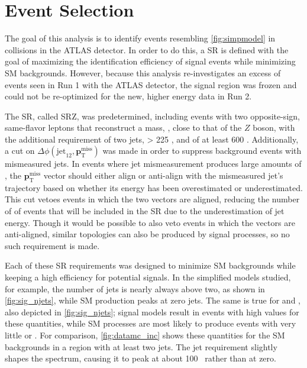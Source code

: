 
\chapter{Event Selection} %
\label{ch:eventsel} 

The goal of this analysis is to identify events resembling \autoref{fig:simpmodel} in collisions in the \ac{ATLAS} detector. In order to do this, a \acf{SR} is defined with the goal of maximizing the identification efficiency of signal events while minimizing \ac{SM} backgrounds. However, because this analysis re-investigates an excess of events seen in Run 1 with the \ac{ATLAS} detector, the signal region was frozen and could not be re-optimized for the new, higher energy data in Run 2. 

The \ac{SR}, called SRZ, was predetermined, including events with two opposite-sign, same-flavor leptons that reconstruct a mass, \mll, close to that of the $Z$ boson, with the additional requirement of two jets, \met > 225 \gev, and \HT of at least 600 \gev. Additionally, a cut on $\Delta\phi(\text{jet}_{12},{\boldsymbol p}_{\mathrm{T}}^{\mathrm{miss}})$ was made in order to suppress \dyjets background events with mismeasured jets. In events where jet mismeasurement produces large amounts of \met, the ${\boldsymbol p}_{\mathrm{T}}^{\mathrm{miss}}$ vector should either align or anti-align with the mismeasured jet's trajectory based on whether its energy has been overestimated or underestimated. This cut vetoes events in which the two vectors are aligned, reducing the number of of events that will be included in the \ac{SR} due to the underestimation of jet energy. Though it would be possible to also veto events in which the vectors are anti-aligned, similar topologies can also be produced by signal processes, so no such requirement is made. 

Each of these \ac{SR} requirements was designed to minimize \ac{SM} backgrounds while keeping a high efficiency for potential signals. In the simplified models studied, for example, the number of jets is nearly always above two, as shown in \autoref{fig:sig_njets}, while \ac{SM} production peaks at zero jets. The same is true for \met and \HT, also depicted in \autoref{fig:sig_njets}; signal models result in events with high values for these quantities, while \ac{SM} processes are most likely to produce events with very little \met or \HT. For comparison, \autoref{fig:datamc_inc} shows these quantities for the \ac{SM} backgrounds in a region with at least two jets. The jet requirement slightly shapes the \HT spectrum, causing it to peak at about 100 \gev~rather than at zero.

